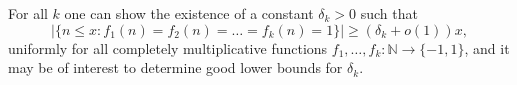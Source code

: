 \documentclass[11pt,makeidx, reqno]{amsart}
\theoremstyle{mystyle}
\theoremstyle{definition}
\begin{document}
\par For all $k$ one can show the existence of a constant $\delta_k >0$ such that  
\[
|\{ n\le x: f_1(n)= f_2(n) =\ldots = f_k(n)=1 \} | \ge (\delta_k + o(1))x, \] 
uniformly for all completely multiplicative functions $f_1, \dots, f_k: \mathbb{N} \to \{ -1, 1\}$, and it may be of interest to determine good lower bounds for $\delta_k$.    




{}
\end{document}
